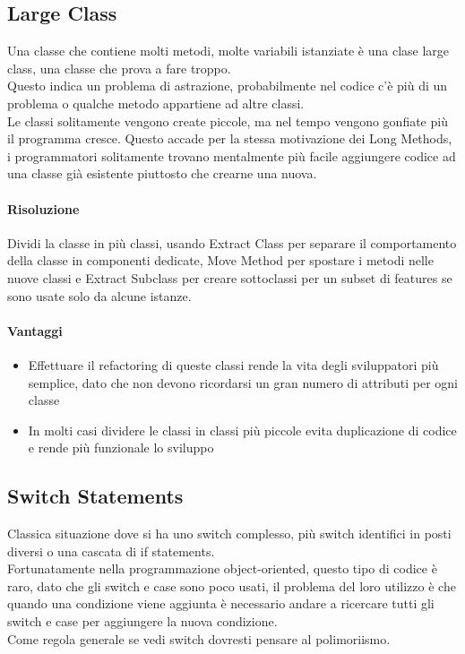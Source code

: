 \subsection{Large Class}
Una classe che contiene molti metodi, molte variabili istanziate è una clase large class, una
classe che prova a fare troppo.\\
Questo indica un problema di astrazione, probabilmente nel codice c'è più di un problema o 
qualche metodo appartiene ad altre classi.\\
Le classi solitamente vengono create piccole, ma nel tempo vengono gonfiate più il programma
cresce. Questo accade per la stessa motivazione dei Long Methods, i programmatori solitamente trovano
mentalmente più facile aggiungere codice ad una classe già esistente piuttosto che crearne una nuova.\\
\paragraph*{Risoluzione} Dividi la classe in più classi, usando Extract Class per separare
il comportamento della classe in componenti dedicate, Move Method per spostare i metodi nelle nuove
classi e Extract Subclass per creare sottoclassi per un subset di features se sono usate solo da
alcune istanze.
\paragraph*{Vantaggi}
\begin{itemize}
    \item Effettuare il refactoring di queste classi rende la vita degli sviluppatori più semplice,
    dato che non devono ricordarsi un gran numero di attributi per ogni classe
    \item In molti casi dividere le classi in classi più piccole evita duplicazione di codice e rende
    più funzionale lo sviluppo
\end{itemize}
\subsection{Switch Statements}
Classica situazione dove si ha uno switch complesso, più switch identifici in posti diversi
o una cascata di if statements.\\
Fortunatamente nella programmazione object-oriented, questo tipo di codice è raro, dato che gli
switch e case sono poco usati, il problema del loro utilizzo è che quando una condizione viene
aggiunta è necessario andare a ricercare tutti gli switch e case per aggiungere la nuova condizione.\\
Come regola generale se vedi switch dovresti pensare al polimoriismo.\\
